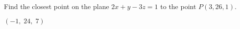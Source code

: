 
\begin{Exercise}[
name={},
title={}, 
difficulty=0,
origin={\cite{YL}}]
Find the closest point on the plane $2x+y-3z =1$ to the point $P(3, 26, 1)$.
\end{Exercise}

\begin{Answer}
$(-1,\;24,\;7)$
\end{Answer}

